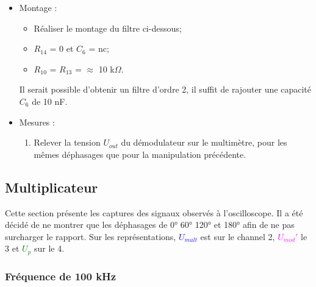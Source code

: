 \begin{itemize}
    \item Montage :
    \begin{itemize}
        \item Réaliser le montage du filtre ci-dessous;
        \item $R_{14}$ = 0 et $C_6$ = nc;
        \item $R_{10}$ = $R_{13}$ = $\approx$ 10 k$\Omega$.
    \end{itemize}

Il serait possible d'obtenir un filtre d'ordre 2, il suffit de rajouter une capacité $C_6$ de 10 nF.\\

    \item Mesures :
    \begin{enumerate}
        \item Relever la tension $U_{out}$ du démodulateur sur le multimètre, pour les mêmes déphasages
        que pour la manipulation précédente.
        
    \end{enumerate}
\end{itemize}

\subsection{Multiplicateur}

Cette section présente les captures des signaux observés à l'oscilloscope. Il a été décidé de
ne montrer que les déphasages de 0° 60° 120° et 180° afin de ne pas surcharger le rapport.
 Sur les représentations, \textcolor{blue}{$U_{mult}$} est sur le channel 2, 
 \textcolor{magenta}{$U_{mod}'$} le 3 et \textcolor{green}{$U_{p}$} sur le 4. 

\subsubsection{Fréquence de 100 kHz}



